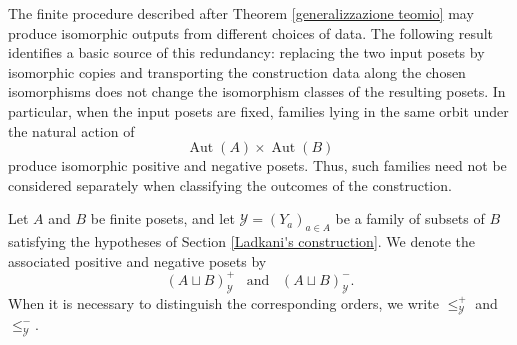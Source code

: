 The finite procedure described after Theorem \ref{generalizzazione teomio} may produce isomorphic outputs from different choices of data. The following result identifies a basic source of this redundancy: replacing the two input posets by isomorphic copies and transporting the construction data along the chosen isomorphisms does not change the isomorphism classes of the resulting posets. In particular, when the input posets are fixed, families lying in the same orbit under the natural action of \[\operatorname{Aut}(A) \times \operatorname{Aut}(B)\] produce isomorphic positive and negative posets. Thus, such families need not be considered separately when classifying the outcomes of the construction. 

Let $A$ and $B$ be finite posets, and let $\mathcal{Y}=(Y_a)_{a\in A}$ be a family of subsets of $B$ satisfying the hypotheses of Section \ref{Ladkani's construction}. We denote the associated positive and negative posets by \[(A \sqcup B)^+_{\mathcal{Y}} \,\,\, \text{ and }\,\,\, (A \sqcup B)^-_{\mathcal{Y}}.\] 
When it is necessary to distinguish the corresponding orders, we write $\leq^+_{\mathcal{Y}}$ and $\leq^-_{\mathcal{Y}}$.

